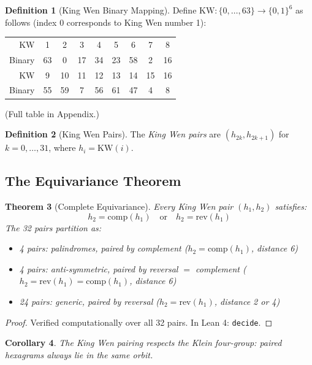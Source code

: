 \documentclass[11pt]{article}
\theoremstyle{definition}
\newtheorem{definition}{Definition}[section]
\theoremstyle{plain}
\newtheorem{theorem}[definition]{Theorem}
\newtheorem{corollary}[definition]{Corollary}
\newcommand{\B}{\{0,1\}}
\newcommand{\comp}{\mathrm{comp}}
\newcommand{\rev}{\mathrm{rev}}
\begin{document}
\begin{definition}[King Wen Binary Mapping]
Define $\mathrm{KW} : \{0, \ldots, 63\} \to \B^6$ as follows (index 0 corresponds to King Wen number 1):
\begin{center}
\small
\begin{tabular}{r|cccccccc}
KW & 1 & 2 & 3 & 4 & 5 & 6 & 7 & 8 \\
Binary & 63 & 0 & 17 & 34 & 23 & 58 & 2 & 16 \\
\midrule
KW & 9 & 10 & 11 & 12 & 13 & 14 & 15 & 16 \\
Binary & 55 & 59 & 7 & 56 & 61 & 47 & 4 & 8 \\
\end{tabular}
\end{center}
(Full table in Appendix.)
\end{definition}

\begin{definition}[King Wen Pairs]
The \emph{King Wen pairs} are $(h_{2k}, h_{2k+1})$ for $k = 0, \ldots, 31$, where $h_i = \mathrm{KW}(i)$.
\end{definition}

\subsection{The Equivariance Theorem}

\begin{theorem}[Complete Equivariance]\label{thm:equivariant}
Every King Wen pair $(h_1, h_2)$ satisfies:
\[
h_2 = \comp(h_1) \quad \text{or} \quad h_2 = \rev(h_1)
\]
The 32 pairs partition as:
\begin{itemize}
    \item 4 pairs: palindromes, paired by complement ($h_2 = \comp(h_1)$, distance 6)
    \item 4 pairs: anti-symmetric, paired by reversal $=$ complement ($h_2 = \rev(h_1) = \comp(h_1)$, distance 6)
    \item 24 pairs: generic, paired by reversal ($h_2 = \rev(h_1)$, distance 2 or 4)
\end{itemize}
\end{theorem}

\begin{proof}
Verified computationally over all 32 pairs. In Lean 4: \texttt{decide}.
\end{proof}

\begin{corollary}
The King Wen pairing respects the Klein four-group: paired hexagrams always lie in the same orbit.
\end{corollary}
\end{document}
